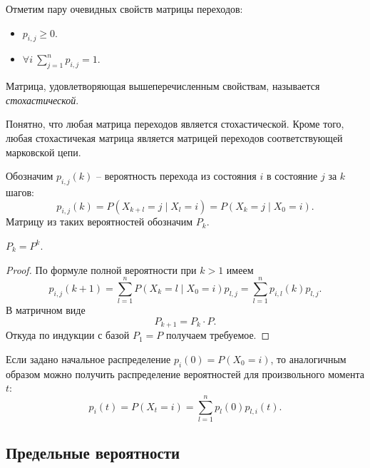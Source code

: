 \begin{remark}
    Отметим пару очевидных свойств матрицы переходов:
    \begin{itemize}
        \item $p_{i, j} \geqslant 0$.
        \item $\forall i~ \sum_{j = 1}^n{p_{i, j}} = 1$.
    \end{itemize}
\end{remark}

\begin{definition}
    Матрица, удовлетворяющая вышеперечисленным свойствам, называется
    \textit{стохастической}.
\end{definition}

\begin{remark}
    Понятно, что любая матрица переходов является стохастической. Кроме того,
    любая стохастичекая матрица является матрицей переходов соответствующей
    марковской цепи.
\end{remark}

\begin{definition}
    Обозначим $p_{i, j}(k)$ -- вероятность перехода из состояния $i$ в состояние
    $j$ за $k$ шагов:
    \[
        p_{i, j}(k) = P(X_{k + l} = j \mid X_l = i) = P(X_k = j \mid X_0 = i)
    .\]
    Матрицу из таких вероятностей обозначим $P_k$.
\end{definition}

\begin{theorem}
    $P_k = P^k$.
\end{theorem}
\begin{proof}
    По формуле полной вероятности при $k > 1$ имеем
    \[
        p_{i, j}(k + 1) = \sum_{l = 1}^n{P(X_k = l \mid X_0 = i) p_{l, j}}
        = \sum_{l = 1}^n{p_{i, l}(k) p_{l, j}}
    .\]
    В матричном виде
    \[
        P_{k + 1} = P_{k} \cdot P
    .\]
    Откуда по индукции с базой $P_1 = P$ получаем требуемое.
\end{proof}

\begin{remark}
    Если задано начальное распределение $p_i(0) = P(X_0 = i)$, то аналогичным
    образом можно получить распределение вероятностей для произвольного момента
    $t$:
    \[
        p_i(t) = P(X_t = i) = \sum_{l = 1}^n{p_l(0) p_{l, i}(t)}
    .\]
\end{remark}

\subsection{Предельные вероятности}

